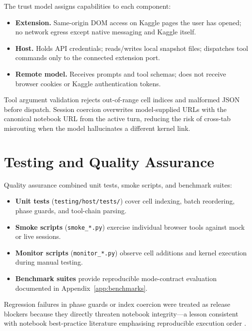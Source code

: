 The trust model assigns capabilities to each component:

\begin{itemize}
  \item \textbf{Extension.} Same-origin \ac{DOM} access on Kaggle pages the user has opened; no network egress except native messaging and Kaggle itself.
  \item \textbf{Host.} Holds \ac{API} credentials; reads/writes local snapshot files; dispatches tool commands only to the connected extension port.
  \item \textbf{Remote model.} Receives prompts and tool schemas; does not receive browser cookies or Kaggle authentication tokens.
\end{itemize}

Tool argument validation rejects out-of-range cell indices and malformed JSON before dispatch. Session coercion overwrites model-supplied URLs with the canonical notebook URL from the active turn, reducing the risk of cross-tab misrouting when the model hallucinates a different kernel link.

\section{Testing and Quality Assurance}
\label{sec:qa}

Quality assurance combined unit tests, smoke scripts, and benchmark suites:

\begin{itemize}
  \item \textbf{Unit tests} (\texttt{testing/host/tests/}) cover cell indexing, batch reordering, phase guards, and tool-chain parsing.
  \item \textbf{Smoke scripts} (\texttt{smoke\_*.py}) exercise individual browser tools against mock or live sessions.
  \item \textbf{Monitor scripts} (\texttt{monitor\_*.py}) observe cell additions and kernel execution during manual testing.
  \item \textbf{Benchmark suites} provide reproducible mode-contract evaluation documented in Appendix~\ref{app:benchmarks}.
\end{itemize}

Regression failures in phase guards or index coercion were treated as release blockers because they directly threaten notebook integrity---a lesson consistent with notebook best-practice literature emphasising reproducible execution order \parencite{rule2019tenrules}.
